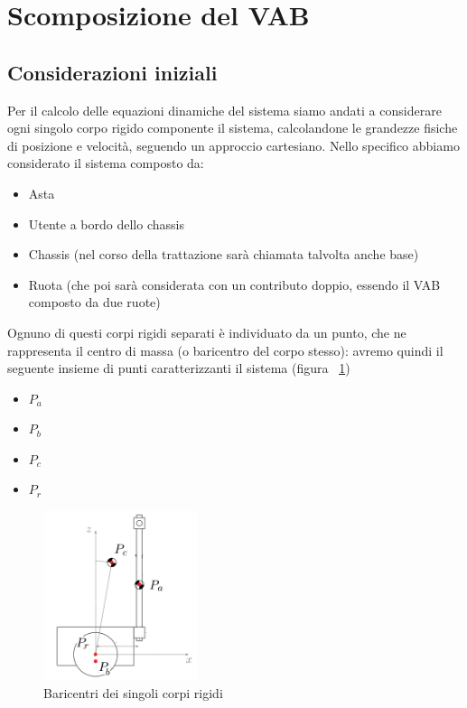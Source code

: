 \section{Scomposizione del VAB}
\label{sec:modellizzazione}
\subsection{Considerazioni iniziali}
Per il calcolo delle equazioni dinamiche del sistema siamo andati a considerare ogni singolo corpo rigido componente il sistema, calcolandone le grandezze fisiche di posizione e velocità, seguendo un approccio cartesiano. 
Nello specifico abbiamo considerato il sistema composto da:
\begin{itemize}
	\item Asta
	\item Utente a bordo dello chassis
	\item Chassis (nel corso della trattazione sarà chiamata talvolta anche base)
	\item Ruota (che poi sarà considerata con un contributo doppio, essendo il VAB composto da due ruote)
\end{itemize}

Ognuno di questi corpi rigidi separati è individuato da un punto, che ne rappresenta il centro di massa (o baricentro del corpo stesso): avremo quindi il seguente insieme di punti caratterizzanti il sistema (figura ~\ref{fig:VAB_baricentri})

\begin{itemize}
	\item \textbf{$P_a$}
	\item \textbf{$P_b$}
	\item \textbf{$P_c$}
	\item \textbf{$P_r$}
\end{itemize}

\begin{figure}[H]
	\centering   	
	\includegraphics[width=0.4\textwidth]{Immagini/VAB_baricentrum.png}
	\caption{Baricentri dei singoli corpi rigidi}
	\label{fig:VAB_baricentri}
\end{figure} 

